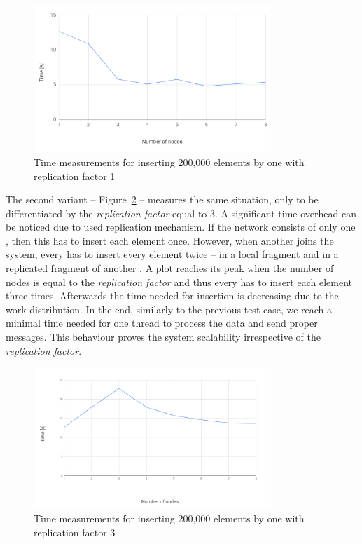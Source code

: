         \begin{figure}[H]
            \centering
            \includegraphics[width=0.8\textwidth]{thesis/figures/rf1.png}
            \caption{Time measurements for inserting 200,000 elements by one \Node with replication factor 1}
            \label{rf1}
        \end{figure}
    
        The second variant -- Figure~\ref{rf3} -- measures the same situation, only to be differentiated by the \textit{replication factor} equal to 3.
        A significant time overhead can be noticed due to used replication mechanism.
        If the network consists of only one \Node, then this \Node has to insert each element once. However, when another \Node joins the system, every \Node has to insert every element twice -- in a local \PHT fragment and in a replicated \PHT fragment of another \Node.
        A plot reaches its peak when the number of nodes is equal to the \textit{replication factor} and thus every \Node has to insert each element three times.
        Afterwards the time needed for insertion is decreasing due to the work distribution.
        In the end, similarly to the previous test case, we reach a minimal time needed for one thread to process the data and send proper messages.
        This behaviour proves the system scalability irrespective of the \textit{replication factor}.
        
        \begin{figure}[ht]
            \centering
            \includegraphics[width=0.8\textwidth]{thesis/figures/rf3.png}
            \caption{Time measurements for inserting 200,000 elements by one \Node with replication factor 3}
            \label{rf3}
        \end{figure}
        
